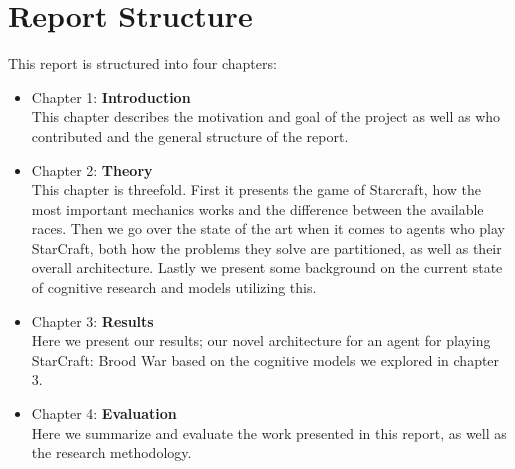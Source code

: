 \section{Report Structure}
\label{sec:structure}
This report is structured into four chapters:
\begin{itemize}
\item Chapter 1: \textbf{Introduction} \\
This chapter describes the motivation and goal of the project as well as who contributed and the general structure of the report.
\item Chapter 2: \textbf{Theory} \\
This chapter is threefold. First it presents the game of Starcraft, how the most important mechanics works and the difference between the
available races. Then we go over the state of the art when it comes to agents
who play StarCraft, both how the problems they solve are partitioned, as well
as their overall architecture. Lastly we present some background on the current state of cognitive research and models
utilizing this.
\item Chapter 3: \textbf{Results} \\
Here we present our results; our novel architecture for an agent for playing
StarCraft: Brood War based on the cognitive models we explored in chapter 3.
\item Chapter 4: \textbf{Evaluation} \\
Here we summarize and evaluate the work presented in this report, as well as the research methodology.

\end{itemize}